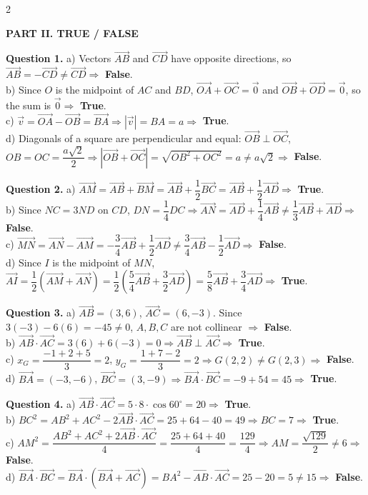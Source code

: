 \documentclass[10pt,a4paper]{article}
\begin{document}
\begin{multicols}{2}
\raggedcolumns
\small

\textbf{\color{accent}PART II. TRUE / FALSE}

\textbf{Question 1.}
a) Vectors $\vec{AB}$ and $\vec{CD}$ have opposite directions, so $\vec{AB} = -\vec{CD} \ne \vec{CD} \Rightarrow$ \textbf{False}.\\
b) Since $O$ is the midpoint of $AC$ and $BD$, $\vec{OA} + \vec{OC} = \vec{0}$ and $\vec{OB} + \vec{OD} = \vec{0}$, so the sum is $\vec{0} \Rightarrow$ \textbf{True}.\\
c) $\vec{v} = \vec{OA} - \vec{OB} = \vec{BA} \Rightarrow |\vec{v}| = BA = a \Rightarrow$ \textbf{True}.\\
d) Diagonals of a square are perpendicular and equal: $\vec{OB} \perp \vec{OC}$, $OB = OC = \dfrac{a\sqrt{2}}{2} \Rightarrow |\vec{OB} + \vec{OC}| = \sqrt{OB^2 + OC^2} = a \ne a\sqrt{2} \Rightarrow$ \textbf{False}.

\textbf{Question 2.}
a) $\vec{AM} = \vec{AB} + \vec{BM} = \vec{AB} + \dfrac{1}{2}\vec{BC} = \vec{AB} + \dfrac{1}{2}\vec{AD} \Rightarrow$ \textbf{True}.\\
b) Since $NC = 3ND$ on $CD$, $DN = \dfrac{1}{4}DC \Rightarrow \vec{AN} = \vec{AD} + \dfrac{1}{4}\vec{AB} \ne \dfrac{1}{3}\vec{AB} + \vec{AD} \Rightarrow$ \textbf{False}.\\
c) $\vec{MN} = \vec{AN} - \vec{AM} = -\dfrac{3}{4}\vec{AB} + \dfrac{1}{2}\vec{AD} \ne \dfrac{3}{4}\vec{AB} - \dfrac{1}{2}\vec{AD} \Rightarrow$ \textbf{False}.\\
d) Since $I$ is the midpoint of $MN$, $\vec{AI} = \dfrac{1}{2}(\vec{AM} + \vec{AN}) = \dfrac{1}{2}\left(\dfrac{5}{4}\vec{AB} + \dfrac{3}{2}\vec{AD}\right) = \dfrac{5}{8}\vec{AB} + \dfrac{3}{4}\vec{AD} \Rightarrow$ \textbf{True}.

\textbf{Question 3.}
a) $\vec{AB} = (3, 6)$, $\vec{AC} = (6, -3)$. Since $3(-3) - 6(6) = -45 \ne 0$, $A, B, C$ are not collinear $\Rightarrow$ \textbf{False}.\\
b) $\vec{AB} \cdot \vec{AC} = 3(6) + 6(-3) = 0 \Rightarrow \vec{AB} \perp \vec{AC} \Rightarrow$ \textbf{True}.\\
c) $x_G = \dfrac{-1+2+5}{3} = 2$, $y_G = \dfrac{1+7-2}{3} = 2 \Rightarrow G(2, 2) \ne G(2, 3) \Rightarrow$ \textbf{False}.\\
d) $\vec{BA} = (-3, -6)$, $\vec{BC} = (3, -9) \Rightarrow \vec{BA} \cdot \vec{BC} = -9 + 54 = 45 \Rightarrow$ \textbf{True}.

\textbf{Question 4.}
a) $\vec{AB} \cdot \vec{AC} = 5 \cdot 8 \cdot \cos 60^\circ = 20 \Rightarrow$ \textbf{True}.\\
b) $BC^2 = AB^2 + AC^2 - 2\vec{AB}\cdot\vec{AC} = 25 + 64 - 40 = 49 \Rightarrow BC = 7 \Rightarrow$ \textbf{True}.\\
c) $AM^2 = \dfrac{AB^2 + AC^2 + 2\vec{AB}\cdot\vec{AC}}{4} = \dfrac{25 + 64 + 40}{4} = \dfrac{129}{4} \Rightarrow AM = \dfrac{\sqrt{129}}{2} \ne 6 \Rightarrow$ \textbf{False}.\\
d) $\vec{BA} \cdot \vec{BC} = \vec{BA} \cdot (\vec{BA} + \vec{AC}) = BA^2 - \vec{AB}\cdot\vec{AC} = 25 - 20 = 5 \ne 15 \Rightarrow$ \textbf{False}.


\end{multicols}
\end{document}
